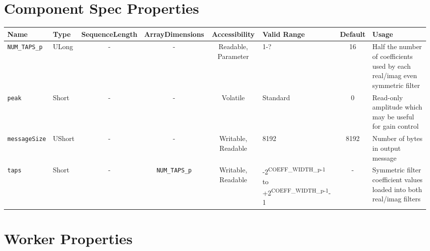 \documentclass{article}
\begin{document}
\begin{landscape}
	\section*{Component Spec Properties}
	\begin{scriptsize}
		\begin{tabular}{|p{1.5cm}|p{1cm}|c|c|c|p{3cm}|c|p{7cm}|}
			\hline
			\rowcolor{blue}
			Name               & Type   & SequenceLength & ArrayDimensions   & Accessibility       & Valid Range                                                                      & Default & Usage                                                                        \\
			\hline
			\verb+NUM_TAPS_p+  & ULong  & -              & -                 & Readable, Parameter & 1-?                                                                              & 16      & Half the number of coefficients used by each real/imag even symmetric filter \\
			\hline
			\verb+peak+        & Short  & -              & -                 & Volatile            & Standard                                                                         & 0       & Read-only amplitude which may be useful for gain control                     \\
			\hline
			\verb+messageSize+ & UShort & -              & -                 & Writable, Readable  & 8192                                                                             & 8192    & Number of bytes in output message                                            \\
			\hline
			\verb+taps+        & Short  & -              & \verb+NUM_TAPS_p+ & Writable, Readable  & -2\textsuperscript{COEFF\_WIDTH\_p-1} to +2\textsuperscript{COEFF\_WIDTH\_p-1}-1 & -       & Symmetric filter coefficient values loaded into both real/imag filters       \\
			\hline
		\end{tabular}
	\end{scriptsize}

	\section*{Worker Properties}

\end{landscape}
\end{document}
